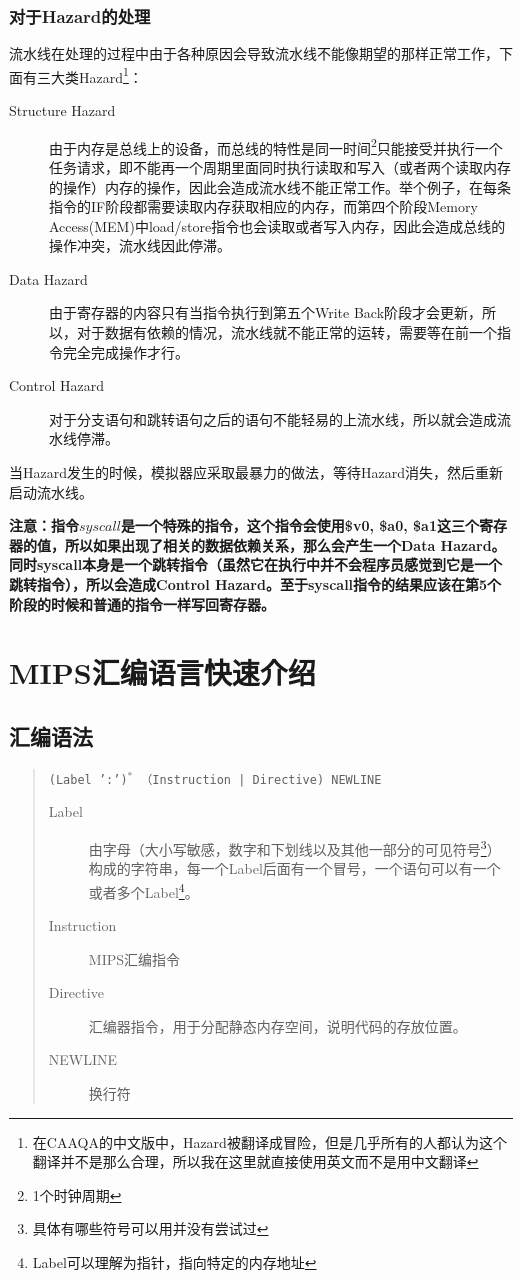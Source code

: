 \documentclass[a4paper, 11pt]{article}
\begin{document}
\subsubsection{对于Hazard的处理}
	流水线在处理的过程中由于各种原因会导致流水线不能像期望的那样正常工作，下面有三大类Hazard\footnote{在CAAQA的中文版中，Hazard被翻译成冒险，但是几乎所有的人都认为这个翻译并不是那么合理，所以我在这里就直接使用英文而不是用中文翻译}：
	\begin{description}
		\item[Structure Hazard] 由于内存是总线上的设备，而总线的特性是同一时间\footnote{1个时钟周期}只能接受并执行一个任务请求，即不能再一个周期里面同时执行读取和写入（或者两个读取内存的操作）内存的操作，因此会造成流水线不能正常工作。举个例子，在每条指令的IF阶段都需要读取内存获取相应的内存，而第四个阶段Memory Access(MEM)中load/store指令也会读取或者写入内存，因此会造成总线的操作冲突，流水线因此停滞。
		\item[Data Hazard] 由于寄存器的内容只有当指令执行到第五个Write Back阶段才会更新，所以，对于数据有依赖的情况，流水线就不能正常的运转，需要等在前一个指令完全完成操作才行。
		\item[Control Hazard] 对于分支语句和跳转语句之后的语句不能轻易的上流水线，所以就会造成流水线停滞。
	\end{description}
	当Hazard发生的时候，模拟器应采取最暴力的做法，等待Hazard消失，然后重新启动流水线。
	
	\textbf{注意：指令$ syscall $是一个特殊的指令，这个指令会使用\$v0, \$a0, \$a1这三个寄存器的值，所以如果出现了相关的数据依赖关系，那么会产生一个Data Hazard。同时syscall本身是一个跳转指令（虽然它在执行中并不会程序员感觉到它是一个跳转指令），所以会造成Control Hazard。至于syscall指令的结果应该在第5个阶段的时候和普通的指令一样写回寄存器。}
\section{MIPS汇编语言快速介绍}
\subsection{汇编语法}
	\begin{quotation}
		\texttt{(Label ':')$^*$ （Instruction | Directive) NEWLINE}
		\begin{description}
			\item [Label] 由字母（大小写敏感，数字和下划线以及其他一部分的可见符号\footnote{具体有哪些符号可以用并没有尝试过}）构成的字符串，每一个Label后面有一个冒号，一个语句可以有一个或者多个Label\footnote{Label可以理解为指针，指向特定的内存地址}。
			\item [Instruction] MIPS汇编指令
			\item [Directive] 汇编器指令，用于分配静态内存空间，说明代码的存放位置。
			\item [NEWLINE] 换行符
		\end{description}
	\end{quotation}
\end{document}
